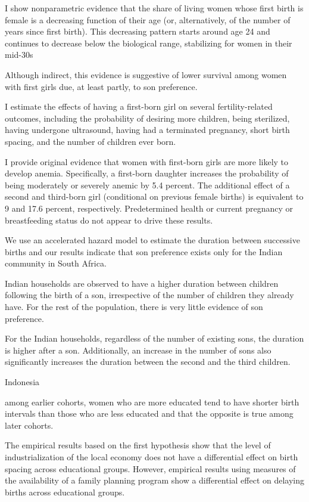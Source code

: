 I show nonparametric evidence that the share of living women whose ﬁrst birth is female is a decreasing function of their age (or, alternatively, of the number of years since ﬁrst birth). This decreasing pattern starts around age 24 and continues to decrease below the biological range, stabilizing for women in their mid-30s

Although indirect, this evidence is suggestive of lower survival among women with ﬁrst girls due, at least partly, to son preference.

I estimate the eﬀects of having a ﬁrst-born girl on several fertility-related outcomes, including the probability of desiring more children, being sterilized, having undergone ultrasound, having had a terminated pregnancy, short birth spacing, and the number of children ever born.

I provide original evidence that women with ﬁrst-born girls are more likely to develop anemia. Speciﬁcally, a ﬁrst-born daughter increases the probability of being moderately or severely anemic by 5.4 percent. The additional eﬀect of a second and third-born girl (conditional on previous female births) is equivalent to 9 and 17.6 percent, respectively. Predetermined health or current pregnancy or breastfeeding status do not appear to drive these results.

\citep{Gangadharan2003}

We use an accelerated hazard model to estimate the duration between successive births and our results indicate that son preference exists only for the Indian community in South Africa.

Indian households are observed to have a higher duration between children following the birth of a son, irrespective of the number of children they already have. For the rest of the population, there is very little evidence of son preference.

For the Indian households, regardless of the number of existing sons, the duration is higher after a son. Additionally, an increase in the number of sons also significantly increases the duration between the second and the third children.

\citep{Kim2010}

Indonesia

among earlier cohorts, women who are more educated tend to have shorter birth intervals than those who are less educated and that the opposite is true among later cohorts.

The empirical results based on the ﬁrst hypothesis show that the level of industrialization of the local economy does not have a differential effect on birth spacing across educational groups. However, empirical results using measures of the availability of a family planning program show a differential effect on delaying births across educational groups.

